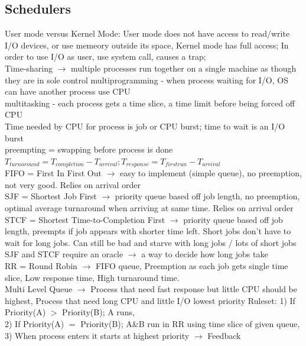 \documentclass[8pt]{article}
\begin{document}
\subsection*{Schedulers}
User mode versus Kernel Mode: User mode does not have access to read/write I/O devices, or use memeory outside its space, Kernel mode has full access;
In order to use I/O as user, use system call, causes a trap;
\\
Time-sharing $\rightarrow$ multiple processes run together on a single machine as though they are in sole control
multiprogramming - when process waiting for I/O, OS can have another process use CPU
\\
multitasking - each process gets a time slice, a time limit before being forced off CPU
\\
Time needed by CPU for process is job or CPU burst; time to wait is an I/O burst
\\
preempting = swapping before process is done
\\
$T_{turnaround} = T_{completion} - T_{arrival}; T_{response} = T_{firstrun} - T_{arrival}$
\\
FIFO = First In First Out $\rightarrow$ easy to implement (simple queue), no preemption, not very good. Relies on arrival order
\\
SJF = Shortest Job First $\rightarrow$ priority queue based off job length, no preemption, optimal average turnaround when arriving at same time. Relies on arrival order
\\
STCF = Shortest Time-to-Completion First $\rightarrow$ priority queue based off job length, preempts if job appears with shorter time left. Short jobs don't have to wait for long jobs. Can still be bad and starve with long jobs / lots of short jobs
\\
SJF and STCF require an oracle $\rightarrow$ a way to decide how long jobs take
\\
RR = Round Robin $\rightarrow$ FIFO queue, Preemption as each job gets single time slice, Low response time, High turnaround time.
\\
Multi Level Queue $\rightarrow$ Process that need fast response but little CPU should be highest, Process that need long CPU and little I/O lowest priority
Ruleset:
1) If Priority(A) $>$ Priority(B); A runs,\\
2) If Priority(A) $=$ Priority(B); A\&B run in RR using time slice of given queue,\\
3) When process enters it starts at highest priority $\rightarrow$ Feedback\\
\end{document}
